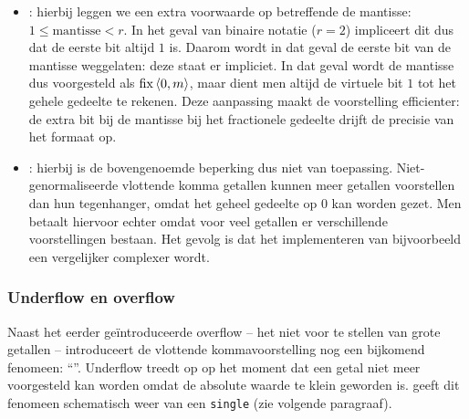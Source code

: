 \begin{itemize}
 \item {}: hierbij leggen we een extra voorwaarde op betreffende de mantisse: $1\leq\mbox{mantisse}<r$. In het geval van binaire notatie ($r=2$) impliceert dit dus dat de eerste bit altijd $1$ is. Daarom wordt in dat geval de eerste bit van de mantisse weggelaten: deze staat er impliciet. In dat geval wordt de mantisse dus voorgesteld als $\operatorname{fix}\left\langle 0,m \right\rangle$, maar dient men altijd de virtuele bit $1$ tot het gehele gedeelte te rekenen. Deze aanpassing maakt de voorstelling efficienter: de extra bit bij de mantisse bij het fractionele gedeelte drijft de precisie van het formaat op.
 \item {}: hierbij is de bovengenoemde beperking dus niet van toepassing. Niet-genormaliseerde vlottende komma getallen kunnen meer getallen voorstellen dan hun tegenhanger, omdat het geheel gedeelte op $0$ kan worden gezet. Men betaalt hiervoor echter omdat voor veel getallen er verschillende voorstellingen bestaan. Het gevolg is dat het implementeren van bijvoorbeeld een vergelijker complexer wordt.
\end{itemize}

\subsubsection{Underflow en overflow}
Naast het eerder ge\"introduceerde overflow -- het niet voor te stellen van grote getallen -- introduceert de vlottende kommavoorstelling nog een bijkomend fenomeen: ``''. Underflow treedt op op het moment dat een getal niet meer voorgesteld kan worden omdat de absolute waarde te klein geworden is.  geeft dit fenomeen schematisch weer van een \texttt{single} (zie volgende paragraaf).

